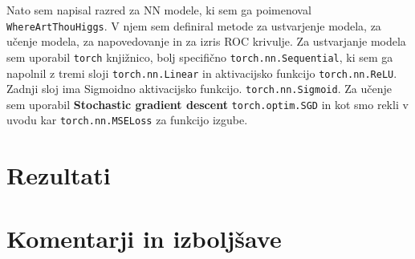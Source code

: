 \documentclass[a4paper]{article}
\begin{document}
Nato sem napisal razred za NN modele, ki sem ga poimenoval \texttt{WhereArtThouHiggs}. V njem sem definiral metode za
ustvarjenje modela, za učenje modela, za napovedovanje in za izris ROC krivulje. Za ustvarjanje modela sem uporabil
\texttt{torch} knjižnico, bolj specifično \texttt{torch.nn.Sequential}, ki sem ga napolnil z tremi sloji 
\texttt{torch.nn.Linear} in aktivacijsko funkcijo \texttt{torch.nn.ReLU}. Zadnji sloj ima Sigmoidno aktivacijsko funkcijo.
\texttt{torch.nn.Sigmoid}. Za učenje sem uporabil \textbf{Stochastic gradient descent} \texttt{torch.optim.SGD} in kot smo 
rekli v uvodu kar \texttt{torch.nn.MSELoss} za funkcijo izgube.
\section{Rezultati}


\section{Komentarji in izboljšave}


\newpage


\end{document}
